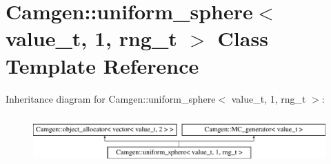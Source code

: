 \hypertarget{a00567}{}\section{Camgen\+:\+:uniform\+\_\+sphere$<$ value\+\_\+t, 1, rng\+\_\+t $>$ Class Template Reference}
\label{a00567}
Inheritance diagram for Camgen\+:\+:uniform\+\_\+sphere$<$ value\+\_\+t, 1, rng\+\_\+t $>$\+:\begin{figure}[H]
\begin{center}
\leavevmode
\includegraphics[height=1.848185cm]{a00567}
\end{center}
\end{figure}
